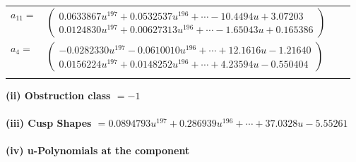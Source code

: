 \documentclass[1p]{elsarticle_modified}
\theoremstyle{definition}
\begin{document}
\begin{tabular}{m{7pt} m{180pt} m{7pt} m{180pt} }
\flushright $a_{11}=$&$\begin{pmatrix}0.0633867 u^{197}+0.0532537 u^{196}+\cdots-10.4494 u+3.07203\\0.0124830 u^{197}+0.00627313 u^{196}+\cdots-1.65043 u+0.165386\end{pmatrix}$ \\
\flushright $a_{4}=$&$\begin{pmatrix}-0.0282330 u^{197}-0.0610010 u^{196}+\cdots+12.1616 u-1.21640\\0.0156224 u^{197}+0.0148252 u^{196}+\cdots+4.23594 u-0.550404\end{pmatrix}$\\&\end{tabular}
\flushleft \textbf{(ii) Obstruction class $= -1$}\\~\\
\flushleft \textbf{(iii) Cusp Shapes $= 0.0894793 u^{197}+0.286939 u^{196}+\cdots+37.0328 u-5.55261$}\\~\\
\newpage\renewcommand{\arraystretch}{1}
\flushleft \textbf{(iv) u-Polynomials at the component}\newline \\
\end{document}
